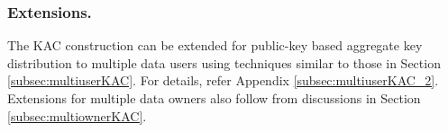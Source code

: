 \subsubsection{Extensions.} The KAC construction can be extended for public-key based aggregate key distribution to multiple data users using techniques similar to those in Section \ref{subsec:multiuserKAC}. For details, refer Appendix \ref{subsec:multiuserKAC_2}. Extensions for multiple data owners also follow from discussions in Section \ref{subsec:multiownerKAC}.












